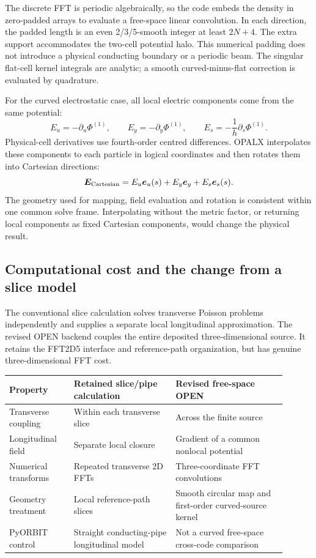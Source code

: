The discrete FFT is periodic algebraically, so the code embeds the density
in zero-padded arrays to evaluate a free-space linear convolution. In each
direction, the padded length is an even 2/3/5-smooth integer at least $2N+4$.
The extra support accommodates the two-cell potential halo. This numerical
padding does not introduce a physical conducting boundary or a periodic beam.
The singular flat-cell kernel integrals are analytic; a smooth
curved-minus-flat correction is evaluated by quadrature.

For the curved electrostatic case, all local electric components come from
the same potential:
\begin{equation}
 E_u=-\partial_u\Phi^{(1)},\qquad
 E_y=-\partial_y\Phi^{(1)},\qquad
 E_s=-\frac1h\partial_s\Phi^{(1)}.
 \label{eq:mg-field}
\end{equation}
Physical-cell derivatives use fourth-order centred differences. OPALX
interpolates these components to each particle in logical coordinates and
then rotates them into Cartesian directions:
\begin{equation}
 \bm E_{\rm Cartesian}
 =E_u\bm e_u(s)+E_y\bm e_y+E_s\bm e_s(s).
 \label{eq:mg-rotate}
\end{equation}
The geometry used for mapping, field evaluation and rotation is consistent
within one common solve frame. Interpolating without the metric factor, or
returning local components as fixed Cartesian components, would change the
physical result.

\clearpage
\subsection{Computational cost and the change from a slice model}
The conventional slice calculation solves transverse Poisson problems
independently and supplies a separate local longitudinal approximation.
The revised OPEN backend couples the entire deposited three-dimensional
source. It retains the FFT2D5 interface and reference-path organization, but
has genuine three-dimensional FFT cost.

\begin{center}\small
\begin{tabular}{p{0.21\linewidth}p{0.33\linewidth}p{0.36\linewidth}}\toprule
Property & Retained slice/pipe calculation & Revised free-space OPEN\\\midrule
Transverse coupling & Within each transverse slice & Across the finite source\\
Longitudinal field & Separate local closure & Gradient of a common nonlocal potential\\
Numerical transforms & Repeated transverse 2D FFTs & Three-coordinate FFT convolutions\\
Geometry treatment & Local reference-path slices & Smooth circular map and first-order curved-source kernel\\
PyORBIT control & Straight conducting-pipe longitudinal model & Not a curved free-space cross-code comparison\\\bottomrule
\end{tabular}
\end{center}

